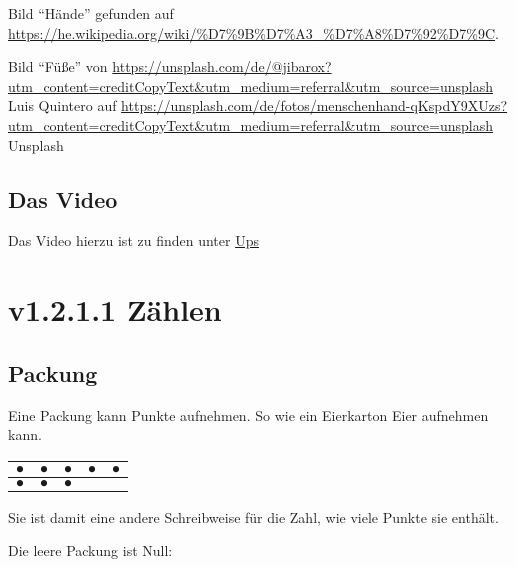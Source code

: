 \documentclass[a4paper]{amsart}
\theoremstyle{definition}
\begin{document}
Bild "`Hände"' gefunden auf \url{https://he.wikipedia.org/wiki/%D7%9B%D7%A3_%D7%A8%D7%92%D7%9C}.

Bild "`Füße"' von \url{https://unsplash.com/de/@jibarox?utm_content=creditCopyText\&utm_medium=referral\&utm_source=unsplash} Luis Quintero auf \url{https://unsplash.com/de/fotos/menschenhand-qKspdY9XUzs?utm\_content=creditCopyText\&utm_medium=referral\&utm\_source=unsplash} Unsplash

\subsection*{Das Video}
Das Video hierzu ist zu finden unter \url{Ups}

\section{v1.2.1.1 Zählen}

\subsection{Packung}
Eine Packung kann Punkte aufnehmen. So wie ein Eierkarton Eier aufnehmen kann. 

\begin{tabular}{|c|c|c|c|c|}
   \hline
   $\bullet$ & $\bullet$ & $\bullet$ & $\bullet$ & $\bullet$\\
   \hline
   $\bullet$ & $\bullet$ & $\bullet$ &  & \\
   \hline
\end{tabular}
Sie ist damit eine andere Schreibweise für die Zahl, wie viele Punkte sie enthält.

Die leere Packung ist Null:
\end{document}
